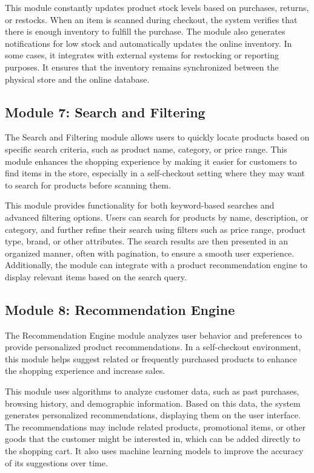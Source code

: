 \documentclass[conference]{IEEEtran}
\begin{document}
This module constantly updates product stock levels based on purchases, returns, or restocks. When an item is scanned during checkout, the system verifies that there is enough inventory to fulfill the purchase. The module also generates notifications for low stock and automatically updates the online inventory. In some cases, it integrates with external systems for restocking or reporting purposes. It ensures that the inventory remains synchronized between the physical store and the online database.

\subsection{Module 7: Search and Filtering}
The Search and Filtering module allows users to quickly locate products based on specific search criteria, such as product name, category, or price range. This module enhances the shopping experience by making it easier for customers to find items in the store, especially in a self-checkout setting where they may want to search for products before scanning them.

This module provides functionality for both keyword-based searches and advanced filtering options. Users can search for products by name, description, or category, and further refine their search using filters such as price range, product type, brand, or other attributes. The search results are then presented in an organized manner, often with pagination, to ensure a smooth user experience. Additionally, the module can integrate with a product recommendation engine to display relevant items based on the search query.
 
\subsection{Module 8: Recommendation Engine}
The Recommendation Engine module analyzes user behavior and preferences to provide personalized product recommendations. In a self-checkout environment, this module helps suggest related or frequently purchased products to enhance the shopping experience and increase sales.

This module uses algorithms to analyze customer data, such as past purchases, browsing history, and demographic information. Based on this data, the system generates personalized recommendations, displaying them on the user interface. The recommendations may include related products, promotional items, or other goods that the customer might be interested in, which can be added directly to the shopping cart. It also uses machine learning models to improve the accuracy of its suggestions over time.
 
\end{document}
